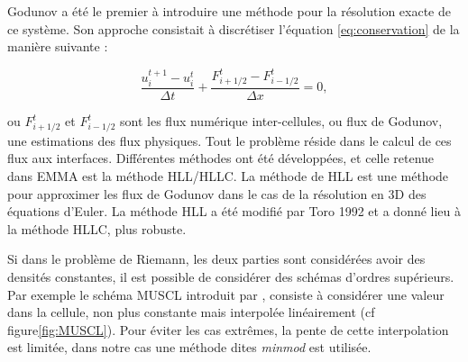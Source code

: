%
%
%

Godunov \cite{MR0119433} a été le premier à introduire une méthode pour la résolution exacte de ce système.
Son approche consistait à discrétiser l'équation \ref{eq:conservation} de la manière suivante : 

\begin{equation}
\frac{ u^{t+1}_i - u^t_i }{\Delta t} + \frac{ F^t_{i+1/2} - F^t_{i-1/2} }{\Delta x} =0,
\label{eq:rad_solver}
\end{equation}

ou $F^t_{i+1/2}$ et $F^t_{i-1/2}$ sont les flux numérique inter-cellules, ou flux de Godunov, une estimations des flux physiques.
Tout le problème réside dans le calcul de ces flux aux interfaces. %
Différentes méthodes ont été développées, et celle retenue dans EMMA est la méthode HLL/HLLC.
La méthode de \ac{HLL} est une méthode pour approximer les flux de Godunov dans le cas de la résolution en 3D des équations d'Euler.
La méthode \ac{HLL} a été modifié par Toro 1992 et a donné lieu à la méthode HLLC, plus robuste.


Si dans le problème de Riemann, les deux parties sont considérées avoir des densités constantes, il est possible de considérer des schémas d'ordres supérieurs.
Par exemple le schéma \ac{MUSCL} introduit par \cite{1979JCoPh..32..101V},  consiste à considérer une valeur dans la cellule, non plus constante mais interpolée linéairement (cf figure\ref{fig:MUSCL}).
Pour éviter les cas extrêmes, la pente de cette interpolation est limitée, dans notre cas une méthode dites \textit{minmod} est utilisée.

